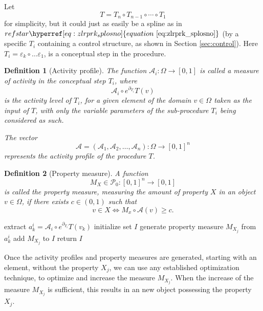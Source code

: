 \documentclass{article}
\makeatletter
\newcommand{\dP}{\mathcal{P}}
\newcommand{\D}{\partial}
\newtheorem{definicija}{Definition}[section]
\let\originaleqref\eqref %
\renewcommand{\eqref}[1]{%
  \begingroup%
  \let\ref\@refstar%
  \hyperref[#1]{%
    equation%
    ~\originaleqref{#1}%
  }%
  \endgroup
}
\makeatother
\begin{document}
   Let 
   $$T=T_n\circ T_{n-1}\circ\cdots\circ T_1$$
   for simplicity, but it could just as easily be a spline as in $\eqref{eq:zlrprk_splosno}$ (by a specific $T_i$ containing a control structure, as shown in Section \ref{sec:control}). Here $T_i=\varepsilon_k\circ\ldots \varepsilon_1$, is a conceptual step in the procedure.
  
   
   \begin{definicija}[Activity profile]
   The function $\mathcal{A}_i:\Omega\to[0,1]$ is called a \emph{measure of activity} in the conceptual step $T_i$, where 
   $$\mathcal{A}_i\circ e^{\D_{T_i}}T(v)$$ 
   is the \emph{activity level} of $T_i$, for a given element of the domain $v\in \Omega$ taken as the input of $T$, with only the variable parameters of the sub-procedure $T_i$ being considered as such.
   
   The vector $$\mathcal{A}=(\mathcal{A}_1,\mathcal{A}_2,\dots,\mathcal{A}_n):\Omega\to[0,1]^n$$ represents the activity profile of the procedure $T$. 
   \end{definicija}
   
   
   \begin{definicija}[Property measure]
    A function 
    $$M_X\in\dP_0:[0,1]^n\to[0,1]$$  
    is called the property measure, measuring the amount of property $X$ in an object $v\in\Omega$, if there exists  $c\in(0,1)$ such that 
    $$v\in X\iff M_x\circ\mathcal{A}(v)\ge c.$$
    \end{definicija}
   
   \begin{algorithm}[H]
   \caption{Construct property measure}
   \label{alg:propertyMeasure}
   \begin{algorithmic}[1]
   \State extract $a^i_k=\mathcal{A}_i\circ e^{\D_{T_i}}T(v_k)$
	\EndFor
	\EndFor
	\State initialize set $I$
   \State generate property measure $M_{X_j}$ from $a^i_k$
   \State add $M_{X_j}$ to $I$
   \EndFor
   \State return $I$
   \EndProcedure
   \end{algorithmic}
   \end{algorithm}
   
   Once the activity profiles and property measures are generated, starting with an element, without the property $X_j$, we can use any established optimization technique, to optimize and increase the measure $M_{X_j}$. When the increase of the measure $M_{X_j}$ is sufficient, this results in an new object possessing the property $X_j$.
   
\end{document}
